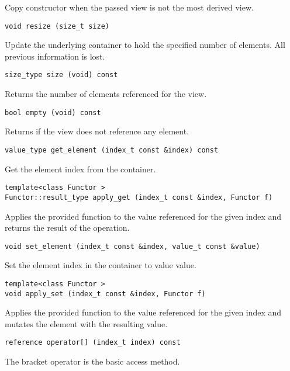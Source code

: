 Copy constructor when the passed view is not the most derived view.

\begin{verbatim}
void resize (size_t size)
\end{verbatim}

Update the underlying container to hold the specified number of elements.
All previous information is lost.

\begin{verbatim}
size_type size (void) const
\end{verbatim}

Returns the number of elements referenced for the view.

\begin{verbatim}
bool empty (void) const
\end{verbatim}

Returns if the view does not reference any element.

\begin{verbatim}
value_type get_element (index_t const &index) const
\end{verbatim}

Get the element index from the container.

\begin{verbatim}
template<class Functor >
Functor::result_type apply_get (index_t const &index, Functor f)
\end{verbatim}

Applies the provided function to the value referenced for the given index and returns the result of the operation.

\begin{verbatim}
void set_element (index_t const &index, value_t const &value)
\end{verbatim}

Set the element index in the container to value value.

\begin{verbatim}
template<class Functor >
void apply_set (index_t const &index, Functor f)
\end{verbatim}

Applies the provided function to the value referenced for the given index and mutates the element with the resulting value.

\begin{verbatim}
reference operator[] (index_t index) const
\end{verbatim}

The bracket operator is the basic access method.

